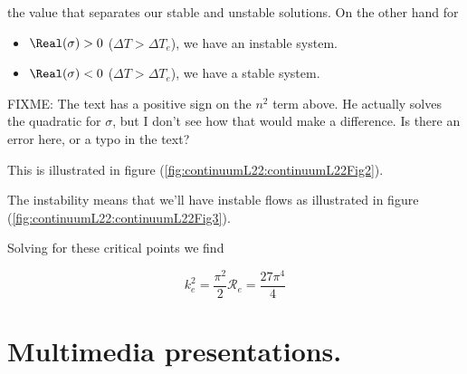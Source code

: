 the value that separates our stable and unstable solutions.  On the other hand for
\begin{itemize}
\item $\Real(\sigma) > 0$ ($\Delta T > \Delta T_e$), we have an instable system.
\item $\Real(\sigma) < 0$ ($\Delta T > \Delta T_e$), we have a stable system.
\end{itemize}

FIXME: The text has a positive sign on the $n^2$ term above.  He actually solves the quadratic for $\sigma$, but I don't see how that would make a difference.  Is there an error here, or a typo in the text?

This is illustrated in figure (\ref{fig:continuumL22:continuumL22Fig2}).


The instability means that we'll have instable flows as illustrated in figure (\ref{fig:continuumL22:continuumL22Fig3}).


Solving for these critical points we find

\begin{subequations}
\begin{equation}\label{eqn:continuumL22:530}
k_e^2 = \frac{\pi^2}{2}
\end{equation}
\begin{equation}\label{eqn:continuumL22:550}
\mathcal{R}_e = \frac{27 \pi^4}{4}
\end{equation}
\end{subequations}

\section{Multimedia presentations.}

